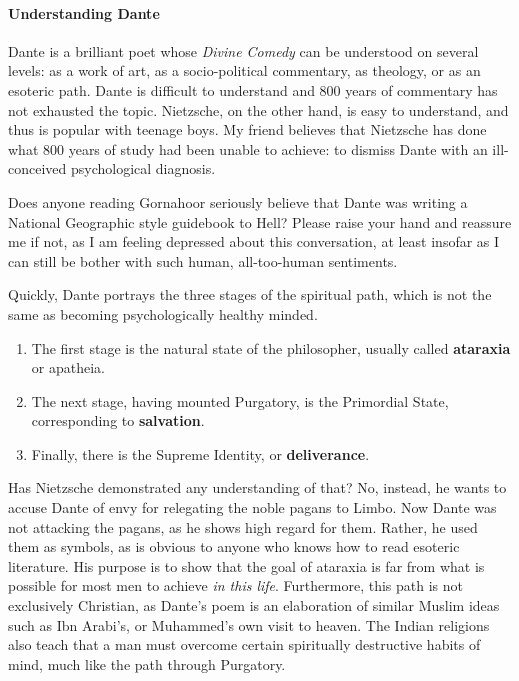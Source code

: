 \paragraph{Understanding Dante}


Dante is a brilliant poet whose \emph{Divine Comedy} can be understood on several levels: as a work of art, as a socio-political commentary, as theology, or as an esoteric path. Dante is difficult to understand and 800 years of commentary has not exhausted the topic. Nietzsche, on the other hand, is easy to understand, and thus is popular with teenage boys. My friend believes that Nietzsche has done what 800 years of study had been unable to achieve: to dismiss Dante with an ill-conceived psychological diagnosis.

Does anyone reading Gornahoor seriously believe that Dante was writing a National Geographic style guidebook to Hell? Please raise your hand and reassure me if not, as I am feeling depressed about this conversation, at least insofar as I can still be bother with such human, all-too-human sentiments.

Quickly, Dante portrays the three stages of the spiritual path, which is not the same as becoming psychologically healthy minded.

\begin{enumerate}


\item The first stage is the natural state of the philosopher, usually called \textbf{ataraxia} or apatheia.

\item The next stage, having mounted Purgatory, is the Primordial State, corresponding to \textbf{salvation}.

\item Finally, there is the Supreme Identity, or \textbf{deliverance}.
\end{enumerate}


Has Nietzsche demonstrated any understanding of that? No, instead, he wants to accuse Dante of envy for relegating the noble pagans to Limbo. Now Dante was not attacking the pagans, as he shows high regard for them. Rather, he used them as symbols, as is obvious to anyone who knows how to read esoteric literature. His purpose is to show that the goal of ataraxia is far from what is possible for most men to achieve \emph{in this life}. Furthermore, this path is not exclusively Christian, as Dante's poem is an elaboration of similar Muslim ideas such as Ibn Arabi's, or Muhammed's own visit to heaven. The Indian religions also teach that a man must overcome certain spiritually destructive habits of mind, much like the path through Purgatory.

